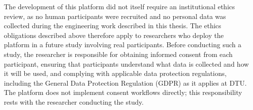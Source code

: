 The development of this platform did not itself require an institutional ethics review, as no human participants were recruited and no personal data was collected during the engineering work described in this thesis.
The ethics obligations described above therefore apply to researchers who deploy the platform in a future study involving real participants.
Before conducting such a study, the researcher is responsible for obtaining informed consent from each participant, ensuring that participants understand what data is collected and how it will be used, and complying with applicable data protection regulations, including the General Data Protection Regulation (GDPR) \cite{gdpr2016} as it applies at DTU.
The platform does not implement consent workflows directly; this responsibility rests with the researcher conducting the study.
